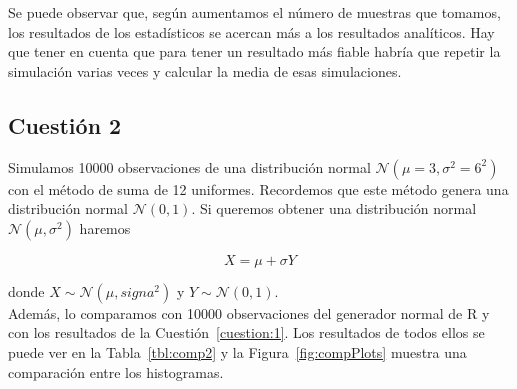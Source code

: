 \documentclass[12pt,a4paper,twoside,openright,titlepage,final]{article}
\begin{document}
Se puede observar que, según aumentamos el número de muestras que tomamos, los resultados de los estadísticos se acercan más a los resultados analíticos. Hay que tener en cuenta que para tener un resultado más fiable habría que repetir la simulación varias veces y calcular la media de esas simulaciones.


\subsection{Cuestión 2}

Simulamos 10000 observaciones de una distribución normal $\mathcal{N}(\mu = 3, \sigma^2 = 6^2)$ con el método de suma de 12 uniformes. Recordemos que este método genera una distribución normal $\mathcal{N}(0,1)$. Si queremos obtener una distribución normal $\mathcal{N}(\mu, \sigma^2)$ haremos

\[ X = \mu + \sigma Y \]

donde $X \sim \mathcal{N}(\mu, signa^2)$ y $Y \sim \mathcal{N}(0,1)$.\\

Además, lo comparamos con 10000 observaciones del generador normal de R y con los resultados de la Cuestión~\ref{cuestion:1}. Los resultados de todos ellos se puede ver en la Tabla~\ref{tbl:comp2} y la Figura~\ref{fig:compPlots} muestra una comparación entre los histogramas.\\
\end{document}
